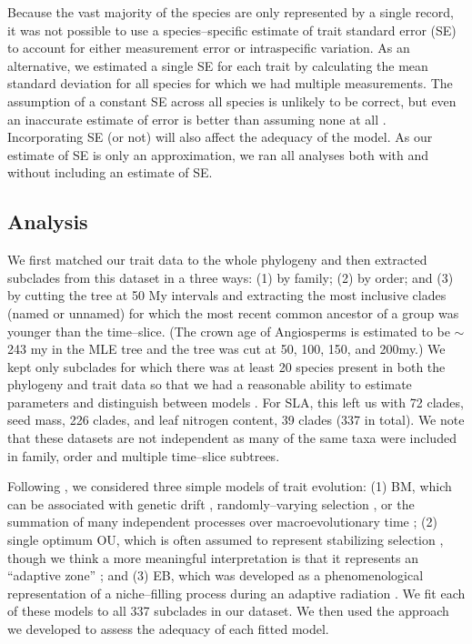 \documentclass[a4paper,11pt]{article}
\begin{document}
Because the vast majority of the species are only represented by a single
record, it was not possible to use a species--specific estimate of
trait standard error (SE) to account for either measurement error or
intraspecific variation.  As an alternative, we estimated a single SE for each trait
by calculating the mean
standard deviation for all species for which we had multiple
measurements. The assumption of a constant SE across all species is
unlikely to be correct, but even an
inaccurate estimate of error is better than assuming none at all
\citep{Hansen2012}. Incorporating SE (or not) will also affect the adequacy of the model. As our estimate of SE is only an approximation, we ran all analyses both with and without including an estimate of SE. 

\subsection{Analysis}

We first matched our trait data to the whole phylogeny and then extracted subclades from this dataset in a three ways: (1) by family; (2) by order; and (3) by cutting the tree at 50 My intervals and extracting the most inclusive clades (named or unnamed) for which the most recent common ancestor of a group was younger than the time--slice. 
(The crown age of Angiosperms is estimated to be $\sim$243 my in the MLE tree and the tree was cut at 50, 100, 150, and 200my.) We kept only subclades for which there was at least 20 species present in both the phylogeny and trait data so that we had a reasonable ability to estimate parameters and distinguish between models \citep{Boettiger2012, SlaterPennell}. 
For SLA, this left us with 72 clades, seed mass, 226 clades, and leaf nitrogen content, 39 clades (337 in total). We note that these datasets are not independent as many of the same taxa were included in family, order and multiple time--slice subtrees. 

Following \citet{Harmon2010}, we considered three simple models of trait evolution: (1) BM, which can be associated with genetic drift \citep{Lande1976, Felsenstein1988, LynchHill1986, Lynch1990, HansenMartins1996}, randomly--varying selection \citep{Felsenstein1973}, or the summation of many independent processes over macroevolutionary time \citep{HansenMartins1996, Uyeda2011, PennellPE}; (2) single optimum OU, which is often assumed to represent stabilizing selection \citep[following][]{Lande1976}, though we think a more meaningful interpretation is that it represents an ``adaptive zone'' \citep{Hansen2012book, PennellHarmon}; and (3) EB, which was developed as a phenomenological representation of a niche--filling process during an adaptive radiation \citep{Blomberg2003, Harmon2010}. We fit each of these models to all 337 subclades in our dataset. We then used the approach we developed to assess the adequacy of each fitted model. 
\end{document}
